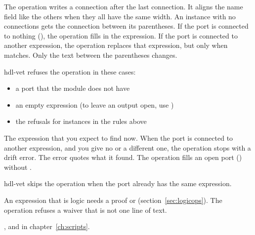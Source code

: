 \begin{entry}{}
\item[Writes] The operation writes a connection  after the last
  connection. It aligns the name field like the others when they all have the same width.
  An instance with no connections gets the connection between its parentheses. If the
  port is connected to nothing (), the operation fills in the expression.
  If the port is connected to another expression, the operation replaces that
  expression, but only when  matches. Only the text between the parentheses
  changes.
\item[Refused] hdl-vet refuses the operation in these cases:
  \begin{itemize}
  \item a port that the module does not have
  \item an empty expression (to leave an output open, use )
  \item the refusals for instances in the rules above
  \end{itemize}
\item[was] The expression that you expect to find now. When the port is connected to
  another expression, and you give no  or a different one, the operation stops
  with a drift error. The error quotes what it found. The operation fills an open port
  () without .
\item[Again] hdl-vet skips the operation when the port already has the same expression.
\item[Waiver] An expression that is logic needs a proof or 
  (section~\ref{sec:logicops}). The operation refuses a waiver that is not one line of text.
\item[Example] , and  in chapter~\ref{ch:scripts}.
\end{entry}

